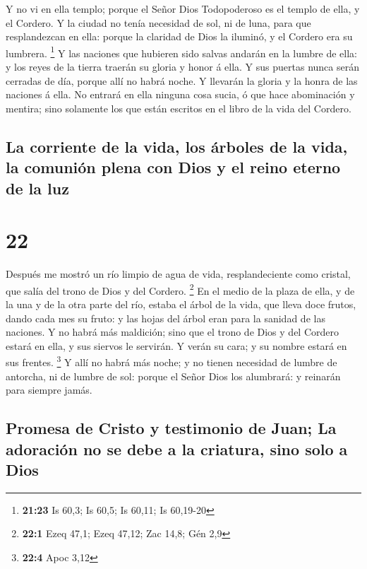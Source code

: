  Y no vi en ella templo; porque el Señor Dios
Todopoderoso es el templo de ella, y el Cordero.  Y la
ciudad no tenía necesidad de sol, ni de luna, para que resplandezcan en
ella: porque la claridad de Dios la iluminó, y el Cordero era su
lumbrera. \footnote{\textbf{21:23} Is 60,3; Is 60,5; Is 60,11; Is
  60,19-20}  Y las naciones que hubieren sido salvas
andarán en la lumbre de ella: y los reyes de la tierra traerán su gloria
y honor á ella.  Y sus puertas nunca serán cerradas de
día, porque allí no habrá noche.  Y llevarán la gloria y
la honra de las naciones á ella.  No entrará en ella
ninguna cosa sucia, ó que hace abominación y mentira; sino solamente los
que están escritos en el libro de la vida del Cordero.

\hypertarget{la-corriente-de-la-vida-los-uxe1rboles-de-la-vida-la-comuniuxf3n-plena-con-dios-y-el-reino-eterno-de-la-luz}{%
\subsection{La corriente de la vida, los árboles de la vida, la comunión
plena con Dios y el reino eterno de la
luz}\label{la-corriente-de-la-vida-los-uxe1rboles-de-la-vida-la-comuniuxf3n-plena-con-dios-y-el-reino-eterno-de-la-luz}}

\hypertarget{section-21}{%
\section{22}\label{section-21}}

 Después me mostró un río limpio de agua de vida,
resplandeciente como cristal, que salía del trono de Dios y del Cordero.
\footnote{\textbf{22:1} Ezeq 47,1; Ezeq 47,12; Zac 14,8; Gén 2,9}
 En el medio de la plaza de ella, y de la una y de la otra
parte del río, estaba el árbol de la vida, que lleva doce frutos, dando
cada mes su fruto: y las hojas del árbol eran para la sanidad de las
naciones.  Y no habrá más maldición; sino que el trono de
Dios y del Cordero estará en ella, y sus siervos le servirán.
 Y verán su cara; y su nombre estará en sus frentes.
\footnote{\textbf{22:4} Apoc 3,12}  Y allí no habrá más
noche; y no tienen necesidad de lumbre de antorcha, ni de lumbre de sol:
porque el Señor Dios los alumbrará: y reinarán para siempre jamás.

\hypertarget{promesa-de-cristo-y-testimonio-de-juan-la-adoraciuxf3n-no-se-debe-a-la-criatura-sino-solo-a-dios}{%
\subsection{Promesa de Cristo y testimonio de Juan; La adoración no se
debe a la criatura, sino solo a
Dios}\label{promesa-de-cristo-y-testimonio-de-juan-la-adoraciuxf3n-no-se-debe-a-la-criatura-sino-solo-a-dios}}

